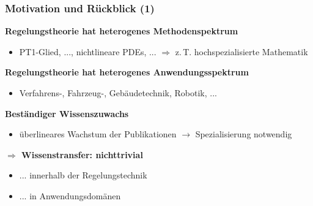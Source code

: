 \documentclass[
	ngerman,
	10pt,				%
	aspectratio=169 	%
]{beamer}
\begin{document}

\begin{frame}[label=ef1]
  \frametitle{\large Motivation und Rückblick (1)}
  
  \textbf{Regelungstheorie hat heterogenes Methodenspektrum}
  \begin{itemize}
    \item PT1-Glied, ..., nichtlineare PDEs, ... \pause $\Rightarrow$ z.\,T. hochspezialisierte Mathematik

  \end{itemize}
  \pause
  \bigskip
  \textbf{Regelungstheorie hat heterogenes Anwendungsspektrum}
  \begin{itemize}
   \item Verfahrens-, Fahrzeug-, Gebäudetechnik, Robotik, ...
  \end{itemize}

  \bigskip
  \textbf{Beständiger Wissenszuwachs}
  \begin{itemize}
   \item überlineares Wachstum der Publikationen $\rightarrow$ Spezialisierung notwendig
  \end{itemize}

  \pause
  \bigskip
  \textbf{$\Rightarrow$ Wissenstransfer: nichttrivial}
  \begin{itemize}
   \item ... innerhalb der Regelungstechnik  
   \item ... in Anwendungsdomänen
  \end{itemize}

\end{frame}
\end{document}
